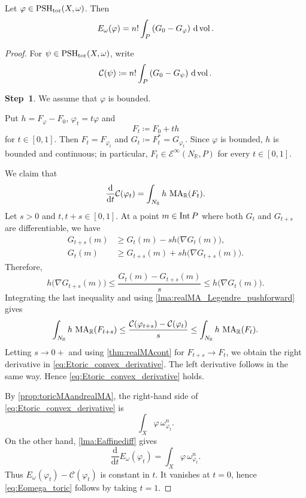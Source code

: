 \begin{proposition}\label{prop:Etoric}
    Let $\varphi\in \mathrm{PSH}_{\mathrm{tor}}(X,\omega)$. Then
    \begin{equation}\label{eq:Eomega_toric}
        E_{\omega}(\varphi)=n!\int_P \left(G_{0}-G_{\varphi}\right)\,\mathrm{d}\operatorname{vol}.
    \end{equation}
\end{proposition}
\begin{proof}
    For $\psi\in \mathrm{PSH}_{\mathrm{tor}}(X,\omega)$, write
    \[
        \mathcal C(\psi)\coloneqq n!\int_P\left(G_0-G_\psi\right)\,\mathrm{d}\operatorname{vol}.
    \]

    \textbf{Step~1}. We assume that $\varphi$ is bounded.

    Put $h=F_{\varphi}-F_0$, $\varphi_t=t\varphi$ and
    \[
        F_t\coloneqq F_0+th
    \]
    for $t\in[0,1]$. Then $F_t=F_{\varphi_t}$ and $G_t\coloneqq F_t^*=G_{\varphi_t}$. Since $\varphi$ is bounded, $h$ is bounded and continuous; in particular, $F_t\in \mathcal E^\infty(N_{\mathbb R},P)$ for every $t\in[0,1]$.

    We claim that
    \begin{equation}\label{eq:Etoric_convex_derivative}
        \frac{\mathrm d}{\mathrm dt}\mathcal C(\varphi_t)=\int_{N_{\mathbb R}}h\,\operatorname{MA}_{\mathbb R}(F_t).
    \end{equation}
    Let $s>0$ and $t,t+s\in[0,1]$. At a point $m\in \operatorname{Int} P$ where both $G_t$ and $G_{t+s}$ are differentiable, we have
    \[
        \begin{aligned}
            G_{t+s}(m)&\geq G_t(m)-s h\bigl(\nabla G_t(m)\bigr),\\
            G_t(m)&\geq G_{t+s}(m)+s h\bigl(\nabla G_{t+s}(m)\bigr).
        \end{aligned}
    \]
    Therefore,
    \[
        h\bigl(\nabla G_{t+s}(m)\bigr)\leq \frac{G_t(m)-G_{t+s}(m)}{s}\leq h\bigl(\nabla G_t(m)\bigr).
    \]
    Integrating the last inequality and using \cref{lma:realMA_Legendre_pushforward} gives
    \[
        \int_{N_{\mathbb R}}h\,\operatorname{MA}_{\mathbb R}(F_{t+s})\leq \frac{\mathcal C(\varphi_{t+s})-\mathcal C(\varphi_t)}{s}\leq \int_{N_{\mathbb R}}h\,\operatorname{MA}_{\mathbb R}(F_t).
    \]
    Letting $s\to 0+$ and using \cref{thm:realMAcont} for $F_{t+s}\to F_t$, we obtain the right derivative in \eqref{eq:Etoric_convex_derivative}. The left derivative follows in the same way. Hence \eqref{eq:Etoric_convex_derivative} holds.

    By \cref{prop:toricMAandrealMA}, the right-hand side of \eqref{eq:Etoric_convex_derivative} is
    \[
        \int_X\varphi\,\omega_{\varphi_t}^n.
    \]
    On the other hand, \cref{lma:Eaffinediff} gives
    \[
        \frac{\mathrm d}{\mathrm dt}E_{\omega}(\varphi_t)=\int_X\varphi\,\omega_{\varphi_t}^n.
    \]
    Thus $E_{\omega}(\varphi_t)-\mathcal C(\varphi_t)$ is constant in $t$. It vanishes at $t=0$, hence \eqref{eq:Eomega_toric} follows by taking $t=1$.


\end{proof}
